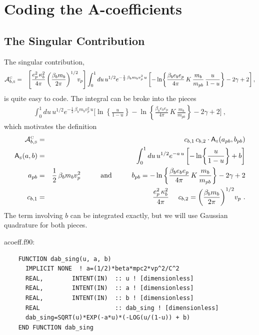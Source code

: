 \documentclass[preprint,12pt,eqsecnum,nofootinbib,amsmath,amssymb]{revtex4}
\newcommand{\smC}{{\rm\scriptscriptstyle C}}
\newcommand{\smS}{{\rm\scriptscriptstyle S}}
\begin{document}
\vfill
\pagebreak
\appendix
\section{Coding the A-coefficients}

\subsection{The Singular Contribution}

The singular contribution,
\begin{eqnarray}
  {\cal A}^\smC_{b,\smS} 
  &=& 
  \left[
  \frac{e_p^2\, \kappa_b^2}{4\pi}
  \left( \frac{\beta_b m_b}{2\pi} \right)^{1/2} \!\! v_p
  \right]
  \int_0^1 du\, u^{1/2} e^{-\frac{1}{2}\, \beta_b m_b v_p^2 \,u}
  \left[-\ln\!\left\{\frac{\beta_b e_b e_p}{4\pi}\,K\,
  \frac{m_b}{m_{pb}}\,\frac{u}{1-u} \right\} 
  -2\gamma + 2
  \right] ,
\nonumber\\
\end{eqnarray}
is quite easy to code. The integral can be broke into the pieces
\begin{eqnarray}
  \int_0^1 du\, u^{1/2} e^{-\frac{1}{2}\, \beta_b m_b v_p^2 \,u}
  \Bigg[\ln\!\left\{\frac{u}{1-u} \right\} 
  -\ln\left\{\frac{\beta_b e_b e_p}{4\pi}\,K\,
  \frac{m_b}{m_{pb}}\right\} 
  -2\gamma + 2 \Bigg] \ ,
\end{eqnarray}
which motivates the definition
\begin{eqnarray}
  {\cal A}^\smC_{b,\smS} 
  &=& 
  c_{b, 1}\, c_{b, 2} 
  \cdot 
  {\sf A}_\smS(a_{pb},b_{pb})
\\
  {\sf A}_\smS(a,b)
  &=&
  \int_0^1 du\, u^{1/2} e^{-a \,u}
  \left[-\ln\!\left\{\frac{u}{1-u} \right\} + b \right]
\\
  a_{pb} &=& \frac{1}{2}\, \beta_b m_b v_p^2
  \hskip1cm 
  \text{and}
  \hskip1cm 
  b_{pb} =
  -\ln\left\{\frac{\beta_b e_b e_p}{4\pi}\,K\,
  \frac{m_b}{m_{pb}}\right\} -2\gamma + 2 
\\
  c_{b, 1} &=& \frac{e_p^2\, \kappa_b^2}{4\pi}
  ~~~~
  c_{b, 2} =
  \left( \frac{\beta_b m_b}{2\pi} \right)^{1/2} \! v_p  \ .
\end{eqnarray}
The term involving $b$ can be integrated exactly, but we will use
Gaussian quadrature for both pieces. 

\vskip0.4cm 
\noindent
acoeff.f90:
{
\baselineskip 10pt
\begin{verbatim}
    FUNCTION dab_sing(u, a, b)
      IMPLICIT NONE  ! a=(1/2)*beta*mpc2*vp^2/C^2
      REAL,        INTENT(IN)  :: u ! [dimensionless]
      REAL,        INTENT(IN)  :: a ! [dimensionless] 
      REAL,        INTENT(IN)  :: b ! [dimensionless]
      REAL                     :: dab_sing ! [dimensionless]
      dab_sing=SQRT(u)*EXP(-a*u)*(-LOG(u/(1-u)) + b)
    END FUNCTION dab_sing
\end{verbatim}
}
\end{document}
